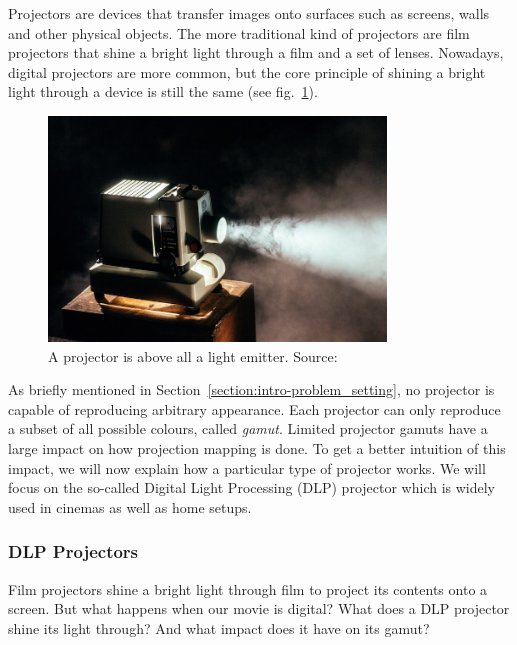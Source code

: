 Projectors are devices that transfer images onto surfaces such as screens, walls and other physical objects. The more traditional kind of projectors are film projectors that shine a bright light through a film and a set of lenses. Nowadays, digital projectors are more common, but the core principle of shining a bright light through a device is still the same (see fig.~\ref{fig:background_projector}).

\begin{figure}[ht]
    \centering
    \includegraphics[width=0.8\textwidth]{images/02-projector.jpg}
    \caption{A projector is above all a light emitter. Source: \citet{ImageProjector}}
    \label{fig:background_projector}
\end{figure}

As briefly mentioned in Section~\ref{section:intro-problem_setting}, no projector is capable of reproducing arbitrary appearance. Each projector can only reproduce a subset of all possible colours, called \textit{gamut}. Limited projector gamuts have a large impact on how projection mapping is done. To get a better intuition of this impact, we will now explain how a particular type of projector works. We will focus on the so-called Digital Light Processing (DLP) projector which is widely used in cinemas as well as home setups.

\subsubsection{DLP Projectors}
\label{section:background-projection_mapping-projectors-DLP}

Film projectors shine a bright light through film to project its contents onto a screen. But what happens when our movie is digital? What does a DLP projector shine its light through? And what impact does it have on its gamut?

